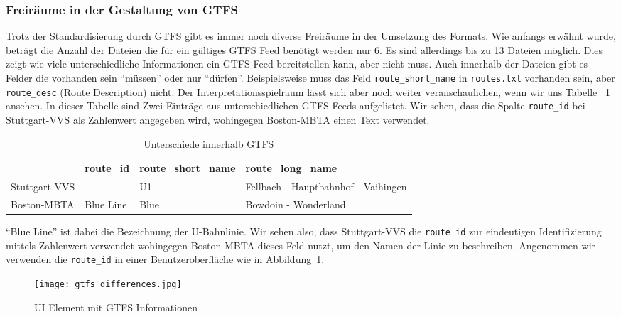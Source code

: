   \subsubsection{Freiräume in der Gestaltung von GTFS}
  \label{ssub:freiräume_in_der_gestaltung_von_gtfs}
    Trotz der Standardisierung durch GTFS gibt es immer noch diverse Freiräume in der Umsetzung des Formats. Wie anfangs erwähnt wurde, beträgt die Anzahl der Dateien die für ein gültiges GTFS Feed benötigt werden nur 6. Es sind allerdings bis zu 13 Dateien möglich. Dies zeigt wie viele unterschiedliche Informationen ein GTFS Feed bereitstellen kann, aber nicht muss. 
    Auch innerhalb der Dateien gibt es Felder die vorhanden sein "`müssen"' oder nur "`dürfen"'. Beispielsweise muss das Feld \texttt{route\_short\_name} in \texttt{routes.txt} vorhanden sein, aber \texttt{route\_desc} (Route Description) nicht. Der Interpretationsspielraum lässt sich aber noch weiter veranschaulichen, wenn wir uns Tabelle ~\ref{table:gtfs_differences} ansehen. In dieser Tabelle sind Zwei Einträge aus unterschiedlichen GTFS Feeds aufgelistet.
    Wir sehen, dass die Spalte \texttt{route\_id} bei Stuttgart-VVS als Zahlenwert angegeben wird, wohingegen Boston-MBTA einen Text verwendet.

    \begin{longtable}{|>{\raggedright \arraybackslash}p{3.0cm}|>{\raggedright \arraybackslash}p{2.0cm}|>{\raggedright \arraybackslash}p{3.5cm}|>{\raggedright \arraybackslash}p{5.5cm}|}
    \caption{Unterschiede innerhalb GTFS} 
    \label{table:gtfs_differences}\\
      \hline
       & route\_id & route\_short\_name & route\_long\_name\\
      \hline
      Stuttgart-VVS & 379 & U1 & Fellbach - Hauptbahnhof - Vaihingen\\
      \hline
      Boston-MBTA & Blue Line & Blue & Bowdoin - Wonderland\\
      \hline
    \end{longtable}

    "`Blue Line"' ist dabei die Bezeichnung der U-Bahnlinie\parencite{wiki_blue_line}. Wir sehen also, dass Stuttgart-VVS die \texttt{route\_id} zur eindeutigen Identifizierung mittels Zahlenwert verwendet wohingegen Boston-MBTA dieses Feld nutzt, um den Namen der Linie zu beschreiben. Angenommen wir verwenden die \texttt{route\_id} in einer Benutzeroberfläche wie in Abbildung~\ref{fig:gtfs_differences}.

    \begin{figure}[htbp]
      \begin{center}
        \texttt{[image: gtfs\_differences.jpg]}
        \caption{UI Element mit GTFS Informationen}
        \label{fig:gtfs_differences}
      \end{center}
    \end{figure}

